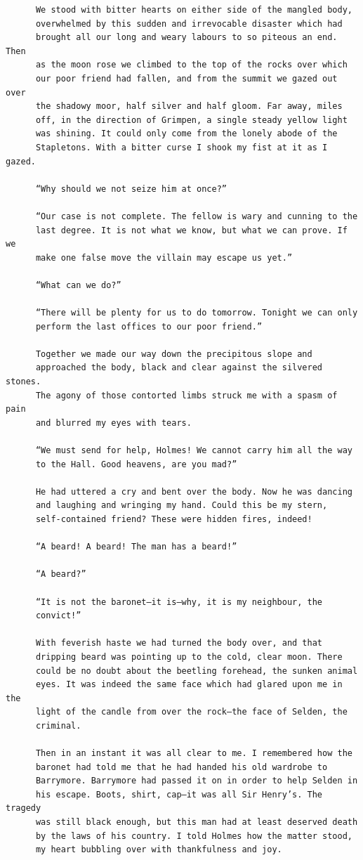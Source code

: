 \documentclass{article}
\begin{document}
\begin{verbatim}
      We stood with bitter hearts on either side of the mangled body,
      overwhelmed by this sudden and irrevocable disaster which had
      brought all our long and weary labours to so piteous an end. Then
      as the moon rose we climbed to the top of the rocks over which
      our poor friend had fallen, and from the summit we gazed out over
      the shadowy moor, half silver and half gloom. Far away, miles
      off, in the direction of Grimpen, a single steady yellow light
      was shining. It could only come from the lonely abode of the
      Stapletons. With a bitter curse I shook my fist at it as I gazed.

      “Why should we not seize him at once?”

      “Our case is not complete. The fellow is wary and cunning to the
      last degree. It is not what we know, but what we can prove. If we
      make one false move the villain may escape us yet.”

      “What can we do?”

      “There will be plenty for us to do tomorrow. Tonight we can only
      perform the last offices to our poor friend.”

      Together we made our way down the precipitous slope and
      approached the body, black and clear against the silvered stones.
      The agony of those contorted limbs struck me with a spasm of pain
      and blurred my eyes with tears.

      “We must send for help, Holmes! We cannot carry him all the way
      to the Hall. Good heavens, are you mad?”

      He had uttered a cry and bent over the body. Now he was dancing
      and laughing and wringing my hand. Could this be my stern,
      self-contained friend? These were hidden fires, indeed!

      “A beard! A beard! The man has a beard!”

      “A beard?”

      “It is not the baronet—it is—why, it is my neighbour, the
      convict!”

      With feverish haste we had turned the body over, and that
      dripping beard was pointing up to the cold, clear moon. There
      could be no doubt about the beetling forehead, the sunken animal
      eyes. It was indeed the same face which had glared upon me in the
      light of the candle from over the rock—the face of Selden, the
      criminal.

      Then in an instant it was all clear to me. I remembered how the
      baronet had told me that he had handed his old wardrobe to
      Barrymore. Barrymore had passed it on in order to help Selden in
      his escape. Boots, shirt, cap—it was all Sir Henry’s. The tragedy
      was still black enough, but this man had at least deserved death
      by the laws of his country. I told Holmes how the matter stood,
      my heart bubbling over with thankfulness and joy.


\end{verbatim}
\end{document}
